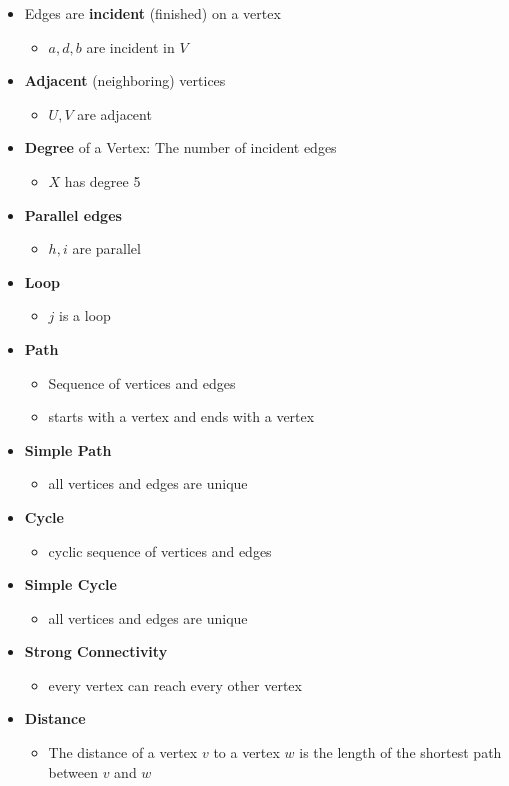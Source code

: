 \documentclass[11pt,twoside,twocolumn,landscape]{article}
\begin{document}
\begin{itemize}
\item Edges are \textbf{incident} (finished) on a vertex
\begin{itemize}
\item \(a, d, b\) are incident in \(V\)
\end{itemize}
\item \textbf{Adjacent} (neighboring) vertices
\begin{itemize}
\item \(U, V\) are adjacent
\end{itemize}
\item \textbf{Degree} of a Vertex: The number of incident edges
\begin{itemize}
\item \(X\) has degree 5
\end{itemize}
\item \textbf{Parallel edges}
\begin{itemize}
\item \(h, i\) are parallel
\end{itemize}
\item \textbf{Loop}
\begin{itemize}
\item \(j\) is a loop
\end{itemize}
\item \textbf{Path}
\begin{itemize}
\item Sequence of vertices and edges
\item starts with a vertex and ends with a vertex
\end{itemize}
\item \textbf{Simple Path}
\begin{itemize}
\item all vertices and edges are unique
\end{itemize}
\item \textbf{Cycle}
\begin{itemize}
\item cyclic sequence of vertices and edges
\end{itemize}
\item \textbf{Simple Cycle}
\begin{itemize}
\item all vertices and edges are unique
\end{itemize}
\item \textbf{Strong Connectivity}
\begin{itemize}
\item every vertex can reach every other vertex
\end{itemize}
\item \textbf{Distance}
\begin{itemize}
\item The distance of a vertex \(v\) to a vertex \(w\) is the length of the shortest path between \(v\) and \(w\)
\end{itemize}
\end{itemize}
\end{document}
